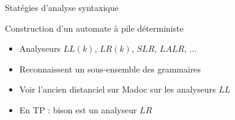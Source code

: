 
\begingroup

\begin{frame}{Statégies d'analyse syntaxique}
  \begin{block}{Construction d'un automate à pile déterministe}
    \begin{itemize}
    \item Analyseurs $LL(k)$, $LR(k)$, $SLR$, $LALR$, ... 
    \item Reconnaissent un sous-ensemble des grammaires
    \item Voir l'ancien distanciel sur Madoc sur les analyseurs $LL$
    \item En TP : bison est un analyseur $LR$
    \end{itemize}
  \end{block}
\end{frame}

\endgroup
